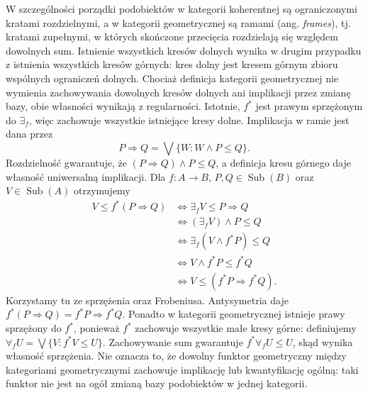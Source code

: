 W szczególności porządki podobiektów w kategorii koherentnej są ograniczonymi kratami rozdzielnymi, a w kategorii geometrycznej są ramami (ang. \emph{frames}), tj. kratami zupełnymi, w których skończone przecięcia rozdzielają się względem dowolnych sum. Istnienie wszystkich kresów dolnych wynika w drugim przypadku z istnienia wszystkich kresów górnych: kres dolny jest kresem górnym zbioru wspólnych ograniczeń dolnych. Chociaż definicja kategorii geometrycznej nie wymienia zachowywania dowolnych kresów dolnych ani implikacji przez zmianę bazy, obie własności wynikają z regularności. Istotnie, $f^*$ jest prawym sprzężonym do $\exists_f$, więc zachowuje wszystkie istniejące kresy dolne. Implikacja w ramie jest dana przez
\[
 P\Rightarrow Q=\bigvee\{W:W\wedge P\leq Q\}.
\]
Rozdzielność gwarantuje, że $(P\Rightarrow Q)\wedge P\leq Q$, a definicja kresu górnego daje własność uniwersalną implikacji. Dla $f:A\to B$, $P,Q\in\operatorname{Sub}(B)$ oraz $V\in\operatorname{Sub}(A)$ otrzymujemy
\[
\begin{aligned}
 V\leq f^*(P\Rightarrow Q)
 &\iff\exists_f V\leq P\Rightarrow Q\\
 &\iff(\exists_f V)\wedge P\leq Q\\
 &\iff\exists_f(V\wedge f^*P)\leq Q\\
 &\iff V\wedge f^*P\leq f^*Q\\
 &\iff V\leq(f^*P\Rightarrow f^*Q).
\end{aligned}
\]
Korzystamy tu ze sprzężenia oraz Frobeniusa. Antysymetria daje $f^*(P\Rightarrow Q)=f^*P\Rightarrow f^*Q$. Ponadto w kategorii geometrycznej istnieje prawy sprzężony do $f^*$, ponieważ $f^*$ zachowuje wszystkie małe kresy górne: definiujemy $\forall_f U=\bigvee\{V:f^*V\leq U\}$. Zachowywanie sum gwarantuje $f^*\forall_f U\leq U$, skąd wynika własność sprzężenia. Nie oznacza to, że dowolny funktor geometryczny między kategoriami geometrycznymi zachowuje implikację lub kwantyfikację ogólną: taki funktor nie jest na ogół zmianą bazy podobiektów w jednej kategorii.

